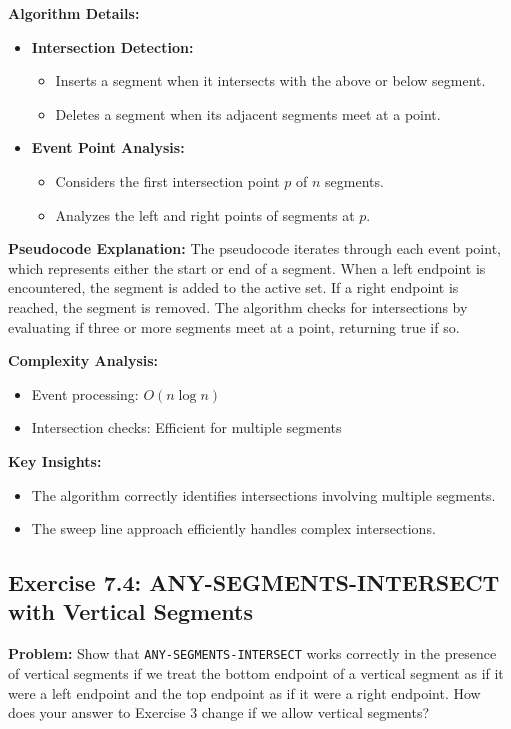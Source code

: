 \textbf{Algorithm Details:}
\begin{itemize}[noitemsep]
    \item \textbf{Intersection Detection:}
        \begin{itemize}[noitemsep]
            \item Inserts a segment when it intersects with the above or below segment.
            \item Deletes a segment when its adjacent segments meet at a point.
        \end{itemize}
    \item \textbf{Event Point Analysis:}
        \begin{itemize}[noitemsep]
            \item Considers the first intersection point $p$ of $n$ segments.
            \item Analyzes the left and right points of segments at $p$.
        \end{itemize}
\end{itemize}

\textbf{Pseudocode Explanation:}
The pseudocode iterates through each event point, which represents either the start or end of a segment. When a left endpoint is encountered, the segment is added to the active set. If a right endpoint is reached, the segment is removed. The algorithm checks for intersections by evaluating if three or more segments meet at a point, returning true if so.

\textbf{Complexity Analysis:}
\begin{itemize}[noitemsep]
    \item Event processing: $O(n \log n)$
    \item Intersection checks: Efficient for multiple segments
\end{itemize}

\textbf{Key Insights:}
\begin{itemize}[noitemsep]
    \item The algorithm correctly identifies intersections involving multiple segments.
    \item The sweep line approach efficiently handles complex intersections.
\end{itemize}

\subsection{Exercise 7.4: ANY-SEGMENTS-INTERSECT with Vertical Segments}
\textbf{Problem:} Show that \texttt{ANY-SEGMENTS-INTERSECT} works correctly in the presence of vertical segments if we treat the bottom endpoint of a vertical segment as if it were a left endpoint and the top endpoint as if it were a right endpoint. How does your answer to Exercise 3 change if we allow vertical segments?

